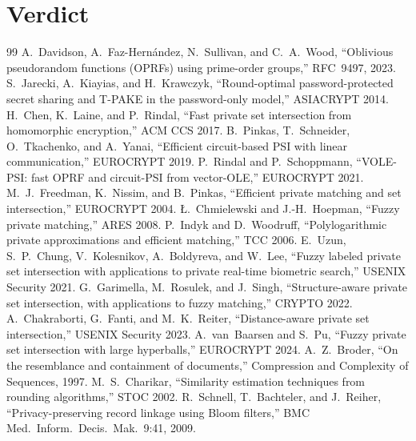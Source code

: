 \documentclass[10pt]{article}
\begin{document}
\section{Verdict}
\label{sec:verdict}


\begin{thebibliography}{99}\small
{} A.~Davidson, A.~Faz-Hern\'andez, N.~Sullivan, and C.~A.~Wood, ``Oblivious pseudorandom functions (OPRFs) using prime-order groups,'' RFC~9497, 2023.
 S.~Jarecki, A.~Kiayias, and H.~Krawczyk, ``Round-optimal password-protected secret sharing and T-PAKE in the password-only model,'' ASIACRYPT 2014.
 H.~Chen, K.~Laine, and P.~Rindal, ``Fast private set intersection from homomorphic encryption,'' ACM CCS 2017.
 B.~Pinkas, T.~Schneider, O.~Tkachenko, and A.~Yanai, ``Efficient circuit-based PSI with linear communication,'' EUROCRYPT 2019.
 P.~Rindal and P.~Schoppmann, ``VOLE-PSI: fast OPRF and circuit-PSI from vector-OLE,'' EUROCRYPT 2021.
 M.~J.~Freedman, K.~Nissim, and B.~Pinkas, ``Efficient private matching and set intersection,'' EUROCRYPT 2004.
 {\L}.~Chmielewski and J.-H.~Hoepman, ``Fuzzy private matching,'' ARES 2008.
 P.~Indyk and D.~Woodruff, ``Polylogarithmic private approximations and efficient matching,'' TCC 2006.
 E.~Uzun, S.~P.~Chung, V.~Kolesnikov, A.~Boldyreva, and W.~Lee, ``Fuzzy labeled private set intersection with applications to private real-time biometric search,'' USENIX Security 2021.
 G.~Garimella, M.~Rosulek, and J.~Singh, ``Structure-aware private set intersection, with applications to fuzzy matching,'' CRYPTO 2022.
 A.~Chakraborti, G.~Fanti, and M.~K.~Reiter, ``Distance-aware private set intersection,'' USENIX Security 2023.
 A.~van~Baarsen and S.~Pu, ``Fuzzy private set intersection with large hyperballs,'' EUROCRYPT 2024.
 A.~Z.~Broder, ``On the resemblance and containment of documents,'' Compression and Complexity of Sequences, 1997.
 M.~S.~Charikar, ``Similarity estimation techniques from rounding algorithms,'' STOC 2002.
 R.~Schnell, T.~Bachteler, and J.~Reiher, ``Privacy-preserving record linkage using Bloom filters,'' BMC Med.\ Inform.\ Decis.\ Mak.\ 9:41, 2009.

\end{thebibliography}
\end{document}
